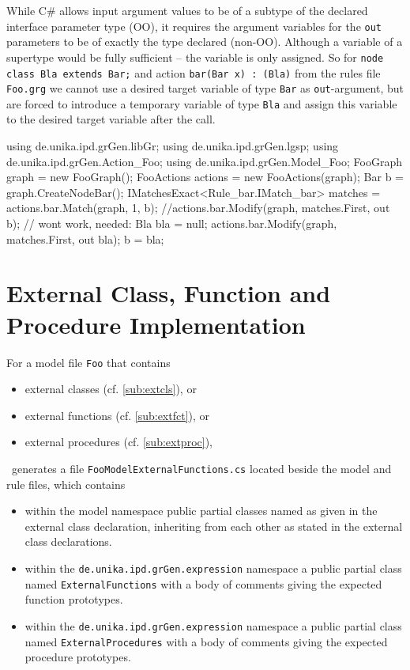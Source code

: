 \begin{warning}
While C\# allows input argument values to be of a subtype of the declared interface parameter type (OO), 
it requires the argument variables for the \texttt{out} parameters to be of exactly the type declared (non-OO).
Although a variable of a supertype would be fully sufficient -- the variable is only assigned.
So for \texttt{node class Bla extends Bar;} and action \texttt{bar(Bar x) : (Bla)} from the rules file \texttt{Foo.grg}
we cannot use a desired target variable of type \texttt{Bar} as \texttt{out}-argument,
but are forced to introduce a temporary variable of type \texttt{Bla}
and assign this variable to the desired target variable after the call.
\begin{csharplet}
using de.unika.ipd.grGen.libGr;
using de.unika.ipd.grGen.lgsp;
using de.unika.ipd.grGen.Action_Foo;
using de.unika.ipd.grGen.Model_Foo;
FooGraph graph = new FooGraph();
FooActions actions = new FooActions(graph);
Bar b = graph.CreateNodeBar();
IMatchesExact<Rule_bar.IMatch_bar> matches = actions.bar.Match(graph, 1, b);
//actions.bar.Modify(graph, matches.First, out b); // wont work, needed:
Bla bla = null; 
actions.bar.Modify(graph, matches.First, out bla);
b = bla;
\end{csharplet}
\end{warning}

\section{External Class, Function and Procedure Implementation}\label{sub:extclsfctimpl}

For a model file \texttt{Foo} that contains 
\begin{itemize}
	\item external classes (cf. \ref{sub:extcls}), or
	\item external functions (cf. \ref{sub:extfct}), or 
	\item external procedures (cf. \ref{sub:extproc}), 
\end{itemize}
\GrG~generates a file \texttt{FooModelExternalFunctions.cs} located beside the model and rule files, which contains
\begin{itemize}
	\item within the model namespace public partial classes named as given in the external class declaration,
inheriting from each other as stated in the external class declarations.
	\item within the \texttt{de.unika.ipd.grGen.expression} namespace a public partial class named \texttt{ExternalFunctions} with a body of comments giving the expected function prototypes.
	\item within the \texttt{de.unika.ipd.grGen.expression} namespace a public partial class named \texttt{ExternalProcedures} with a body of comments giving the expected procedure prototypes.
\end{itemize}


